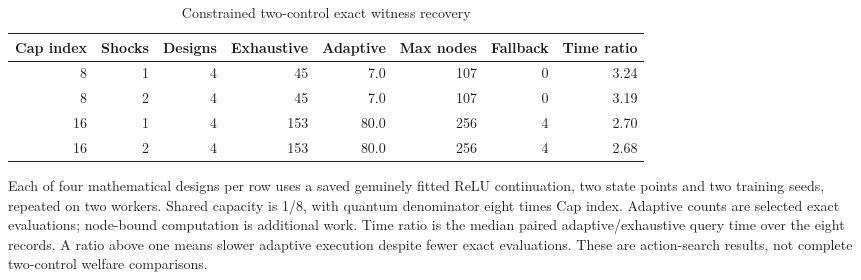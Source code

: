 \begin{table}[htbp]
\centering
\caption{Constrained two-control exact witness recovery}\label{tab:multi61}
{\small\setlength{\tabcolsep}{3pt}
\begin{tabular}{rrrrrrrr}
\hline
Cap index & Shocks & Designs & Exhaustive & Adaptive & Max nodes & Fallback & Time ratio \\
\hline
8 & 1 & 4 & 45 & 7.0 & 107 & 0 & 3.24 \\
8 & 2 & 4 & 45 & 7.0 & 107 & 0 & 3.19 \\
16 & 1 & 4 & 153 & 80.0 & 256 & 4 & 2.70 \\
16 & 2 & 4 & 153 & 80.0 & 256 & 4 & 2.68 \\
\hline\end{tabular}}
\par\smallskip
{\footnotesize Each of four mathematical designs per row uses a saved genuinely fitted ReLU continuation, two state points and two training seeds, repeated on two workers. Shared capacity is 1/8, with quantum denominator eight times Cap index. Adaptive counts are selected exact evaluations; node-bound computation is additional work. Time ratio is the median paired adaptive/exhaustive query time over the eight records. A ratio above one means slower adaptive execution despite fewer exact evaluations. These are action-search results, not complete two-control welfare comparisons.}
\end{table}
